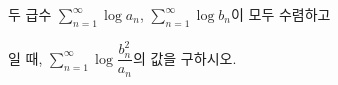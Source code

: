두 급수 $\displaystyle\sum_{n=1}^{\infty}\log a_n$, $\displaystyle\sum_{n=1}^{\infty}\log b_n$이 모두 수렴하고 \par\smallskip{}\par\smallskip\noindent 일 때, $\displaystyle\sum_{n=1}^{\infty}\log\dfrac{b_n^2}{a_n}$의 값을 구하시오.
